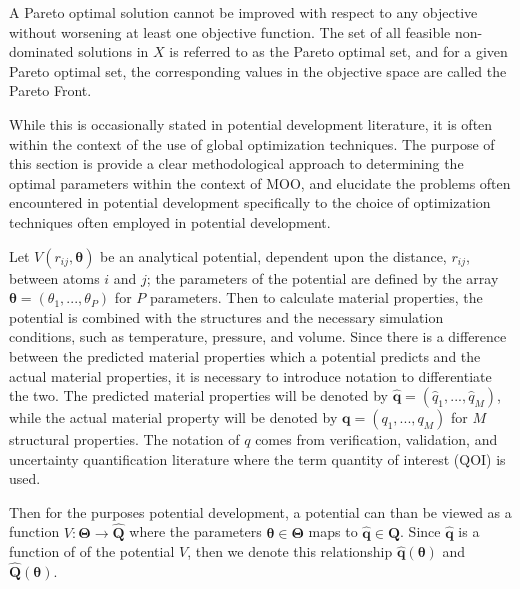 A Pareto optimal solution cannot be improved with respect to any objective without worsening at least one objective function.  The set of all feasible non-dominated solutions in $X$ is referred to as the Pareto optimal set, and for a given Pareto optimal set, the corresponding values in the objective space are called the Pareto Front.


While this is occasionally stated in potential development literature, it is often within the context of the use of global optimization techniques.
The purpose of this section is provide a clear methodological approach to determining the optimal parameters within the context of MOO, and elucidate the problems often encountered in potential development specifically to the choice of optimization techniques often employed in potential development.

Let $V(r_{ij},\bm{\theta})$ be an analytical potential, dependent upon the distance, $r_{ij}$, between atoms $i$ and $j$; the parameters of the potential are defined by the array $\bm{\theta}=(\theta_1,...,\theta_P)$ for $P$ parameters.
Then to calculate material properties, the potential is combined with the structures and the necessary simulation conditions, such as temperature, pressure, and volume.
Since there is a difference between the predicted material properties which a potential predicts and the actual material properties, it is necessary to introduce notation to differentiate the two.
The predicted material properties will be denoted by $\hat{\bm{q}} = (\hat{q}_1,...,\hat{q}_M)$, while the actual material property will be denoted by $\bm{q} = (q_1,...,q_M)$ for $M$ structural properties.  The notation of $q$ comes from verification, validation, and uncertainty quantification literature where the term quantity of interest (QOI) is used.

Then for the purposes potential development, a potential can than be viewed as a function $V:\bm{\Theta} \rightarrow \hat{\bm{Q}}$ where the parameters $\bm{\theta} \in \bm{\Theta}$ maps to $\hat{\bm{q}} \in \hat{\bm{Q}}$.
Since $\hat{\bm{q}}$ is a function of of the potential $V$, then we denote this relationship
$\hat{\bm{q}}(\bm{\theta})$ and
$\hat{\bm{Q}}(\bm{\theta})$.






